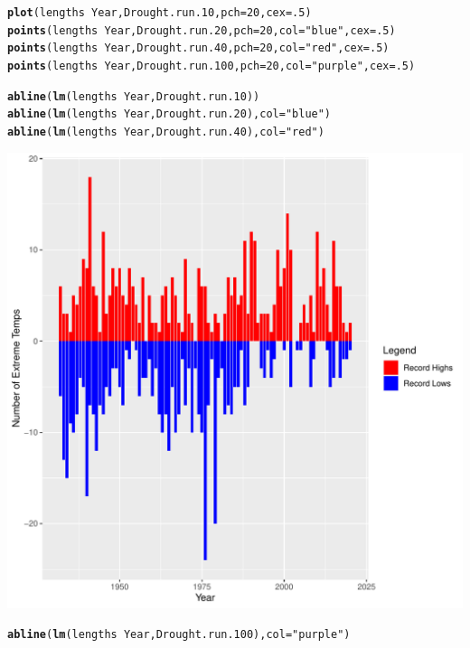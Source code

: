 \documentclass{article}\usepackage[]{graphicx}\usepackage[]{color}
\makeatletter
\def\maxwidth{ %
  \ifdim\Gin@nat@width>\linewidth
    \linewidth
  \else
    \Gin@nat@width
  \fi
}
\newcommand{\hlnum}[1]{\textcolor[rgb]{0.686,0.059,0.569}{#1}}%
\newcommand{\hlstr}[1]{\textcolor[rgb]{0.192,0.494,0.8}{#1}}%
\newcommand{\hlopt}[1]{\textcolor[rgb]{0,0,0}{#1}}%
\newcommand{\hlstd}[1]{\textcolor[rgb]{0.345,0.345,0.345}{#1}}%
\newcommand{\hlkwc}[1]{\textcolor[rgb]{0.333,0.667,0.333}{#1}}%
\newcommand{\hlkwd}[1]{\textcolor[rgb]{0.737,0.353,0.396}{\textbf{#1}}}%
\newenvironment{kframe}{%
 \def\at@end@of@kframe{}%
 \ifinner\ifhmode%
  \def\at@end@of@kframe{\end{minipage}}%
  \begin{minipage}{\columnwidth}%
 \fi\fi%
 \def\FrameCommand##1{\hskip\@totalleftmargin \hskip-\fboxsep
 \colorbox{shadecolor}{##1}\hskip-\fboxsep
     \hskip-\linewidth \hskip-\@totalleftmargin \hskip\columnwidth}%
 \MakeFramed {\advance\hsize-\width
   \@totalleftmargin\z@ \linewidth\hsize
   \@setminipage}}%
 {\par\unskip\endMakeFramed%
 \at@end@of@kframe}
\newenvironment{knitrout}{}{} %
\makeatother
\begin{document}
\begin{knitrout}
\begin{kframe}
{\ttfamily\noindent\bfseries\color{errorcolor}{\#\# Error in aggregate.data.frame(mf[1L], mf[-1L], FUN = FUN, ...): no rows to aggregate}}\begin{alltt}
\hlkwd{plot}\hlstd{(lengths}\hlopt{~}\hlstd{Year, Drought.run.10,} \hlkwc{pch}\hlstd{=}\hlnum{20}\hlstd{,} \hlkwc{cex}\hlstd{=}\hlnum{.5}\hlstd{)}
\hlkwd{points}\hlstd{(lengths}\hlopt{~}\hlstd{Year, Drought.run.20,} \hlkwc{pch}\hlstd{=}\hlnum{20}\hlstd{,} \hlkwc{col}\hlstd{=}\hlstr{"blue"}\hlstd{,} \hlkwc{cex}\hlstd{=}\hlnum{.5}\hlstd{)}
\hlkwd{points}\hlstd{(lengths}\hlopt{~}\hlstd{Year, Drought.run.40,} \hlkwc{pch}\hlstd{=}\hlnum{20}\hlstd{,} \hlkwc{col}\hlstd{=}\hlstr{"red"}\hlstd{,} \hlkwc{cex}\hlstd{=}\hlnum{.5}\hlstd{)}
\hlkwd{points}\hlstd{(lengths}\hlopt{~}\hlstd{Year, Drought.run.100,} \hlkwc{pch}\hlstd{=}\hlnum{20}\hlstd{,} \hlkwc{col}\hlstd{=}\hlstr{"purple"}\hlstd{,} \hlkwc{cex}\hlstd{=}\hlnum{.5}\hlstd{)}
\end{alltt}


{\ttfamily\noindent\bfseries\color{errorcolor}{\#\# Error in eval(m\$data, eframe): object 'Drought.run.100' not found}}\begin{alltt}
\hlkwd{abline}\hlstd{(}\hlkwd{lm}\hlstd{(lengths}\hlopt{~}\hlstd{Year, Drought.run.10))}
\hlkwd{abline}\hlstd{(}\hlkwd{lm}\hlstd{(lengths}\hlopt{~}\hlstd{Year, Drought.run.20),} \hlkwc{col}\hlstd{=}\hlstr{"blue"}\hlstd{)}
\hlkwd{abline}\hlstd{(}\hlkwd{lm}\hlstd{(lengths}\hlopt{~}\hlstd{Year, Drought.run.40),} \hlkwc{col}\hlstd{=}\hlstr{"red"}\hlstd{)}
\end{alltt}
\end{kframe}
\includegraphics[width=\maxwidth]{figure/unnamed-chunk-15-1} 
\begin{kframe}\begin{alltt}
\hlkwd{abline}\hlstd{(}\hlkwd{lm}\hlstd{(lengths}\hlopt{~}\hlstd{Year, Drought.run.100),} \hlkwc{col}\hlstd{=}\hlstr{"purple"}\hlstd{)}
\end{alltt}



\end{kframe}
\end{knitrout}
\end{document}
